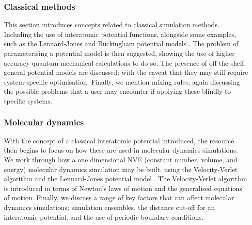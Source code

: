 \subsubsection{Classical methods}

This section introduces concepts related to classical simulation methods.
Including the use of interatomic potential functions, alongside some examples, such as the Lennard-Jones and Buckingham potential models \cite{lennard-jones_determination_1924,buckingham_classical_1938}.
The problem of parameterising a potential model is then suggested, showing the use of higher accuracy quantum mechanical calculations to do so.
The presence of off-the-shelf, general potential models are discussed; with the caveat that they may still require system-specific optimisation.
Finally, we mention mixing rules; again discussing the possible problems that a user may encounter if applying these blindly to specific systems.

\subsubsection{Molecular dynamics}
With the concept of a classical interatomic potential introduced, the resource then begins to focus on how these are used in molecular dynamics simulations.
We work through how a one dimensional NVE (constant number, volume, and energy) molecular dynamics simulation may be built, using the Velocity-Verlet algorithm and the Lennard-Jones potential model \cite{swope_computer_1982,lennard-jones_determination_1924}.
The Velocity-Verlet algorithm is introduced in terms of Newton's laws of motion and the generalised equations of motion.
Finally, we discuss a range of key factors that can affect molecular dynamics simulations; simulation ensembles, the distance cut-off for an interatomic potential, and the use of periodic boundary conditions.

